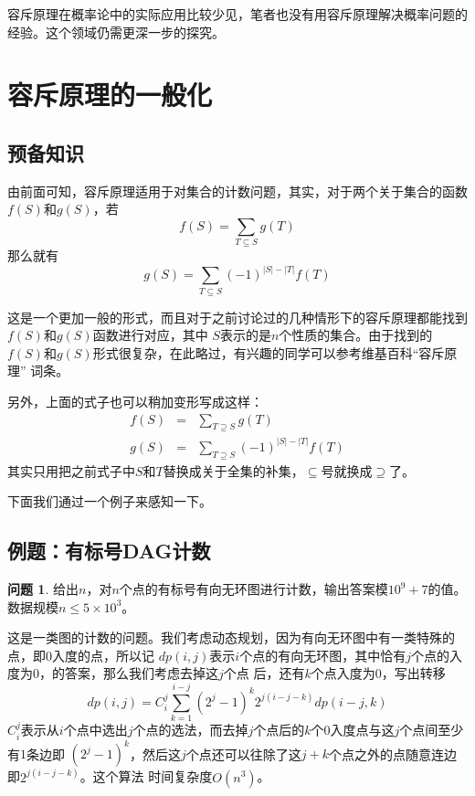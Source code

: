 \documentclass{noithesis}
\theoremstyle{plain}      \newtheorem{theorem}{定理}[subsection]
\theoremstyle{definition} \newtheorem{problem}{问题}[subsection]
\begin{document}
容斥原理在概率论中的实际应用比较少见，笔者也没有用容斥原理解决概率问题的经验。这个领域仍需更深一步的探究。

\section{容斥原理的一般化}

\subsection{预备知识}

由前面可知，容斥原理适用于对集合的计数问题，其实，对于两个关于集合的函数$f(S)$和$g(S)$，若
\[
f(S) = \sum_{T \subseteq S} g(T)
\]
那么就有
\[
g(S) = \sum_{T \subseteq S} (-1)^{|S| - |T|} f(T)
\]
\par

这是一个更加一般的形式，而且对于之前讨论过的几种情形下的容斥原理都能找到$f(S)$和$g(S)$函数进行对应，其中
$S$表示的是$n$个性质的集合。由于找到的$f(S)$和$g(S)$形式很复杂，在此略过，有兴趣的同学可以参考维基百科“容斥原理”
词条。 \par

另外，上面的式子也可以稍加变形写成这样：
\begin{eqnarray*}
f(S) & = & \sum_{T \supseteq S} g(T) \\
g(S) & = & \sum_{T \supseteq S} (-1)^{|S| - |T|} f(T)
\end{eqnarray*}
其实只用把之前式子中$S$和$T$替换成关于全集的补集，$\subseteq$号就换成$\supseteq$了。 \par

下面我们通过一个例子来感知一下。

\subsection{例题：有标号DAG计数}

\begin{problem}
给出$n$，对$n$个点的有标号有向无环图进行计数，输出答案模$10^9+7$的值。数据规模$n \le 5 \times 10^3$。
\end{problem}
\par

这是一类图的计数的问题。我们考虑动态规划，因为有向无环图中有一类特殊的点，即$0$入度的点，所以记
$dp(i,j)$表示$i$个点的有向无环图，其中恰有$j$个点的入度为$0$，的答案，那么我们考虑去掉这$j$个点
后，还有$k$个点入度为$0$，写出转移
\[
dp(i,j) = C_i^j \sum_{k=1}^{i-j} (2^j - 1)^k 2^{j(i - j - k)} dp(i - j, k)
\]
$C_i^j$表示从$i$个点中选出$j$个点的选法，而去掉$j$个点后的$k$个$0$入度点与这$j$个点间至少有$1$条边即
$(2^j -1)^k$，然后这$j$个点还可以往除了这$j+k$个点之外的点随意连边即$2^{j(i - j - k)}$。这个算法
时间复杂度$O(n^3)$。 \par
\end{document}
